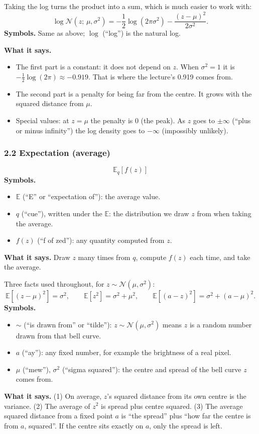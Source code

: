 Taking the log turns the product into a sum, which is much easier to work with:
\[
\log \mathcal{N}(z;\, \mu, \sigma^2) = -\frac{1}{2}\log(2\pi\sigma^2) - \frac{(z-\mu)^2}{2\sigma^2}.
\]
\textbf{Symbols.} Same as above; $\log$ (``log'') is the natural log.

\textbf{What it says.}
\begin{itemize}[leftmargin=1.5em]
\item The first part is a constant: it does not depend on $z$. When $\sigma^2 = 1$ it is $-\tfrac{1}{2}\log(2\pi) \approx -0.919$. That is where the lecture's 0.919 comes from.
\item The second part is a penalty for being far from the centre. It grows with the squared distance from $\mu$.
\item Special values: at $z = \mu$ the penalty is 0 (the peak). As $z$ goes to $\pm\infty$ (``plus or minus infinity'') the log density goes to $-\infty$ (impossibly unlikely).
\end{itemize}

\subsubsection*{2.2 Expectation (average)}

\[
\mathbb{E}_q[f(z)]
\]
\textbf{Symbols.}
\begin{itemize}[leftmargin=1.5em, itemsep=0pt]
\item $\mathbb{E}$ (``E'' or ``expectation of''): the average value.
\item $q$ (``cue''), written under the $\mathbb{E}$: the distribution we draw $z$ from when taking the average.
\item $f(z)$ (``f of zed''): any quantity computed from $z$.
\end{itemize}
\textbf{What it says.} Draw $z$ many times from $q$, compute $f(z)$ each time, and take the average.

Three facts used throughout, for $z \sim \mathcal{N}(\mu, \sigma^2)$:
\[
\mathbb{E}[(z-\mu)^2] = \sigma^2,
\qquad
\mathbb{E}[z^2] = \sigma^2 + \mu^2,
\qquad
\mathbb{E}[(a - z)^2] = \sigma^2 + (a-\mu)^2.
\]
\textbf{Symbols.}
\begin{itemize}[leftmargin=1.5em, itemsep=0pt]
\item $\sim$ (``is drawn from'' or ``tilde''): $z \sim \mathcal{N}(\mu, \sigma^2)$ means $z$ is a random number drawn from that bell curve.
\item $a$ (``ay''): any fixed number, for example the brightness of a real pixel.
\item $\mu$ (``mew''), $\sigma^2$ (``sigma squared''): the centre and spread of the bell curve $z$ comes from.
\end{itemize}
\textbf{What it says.} (1) On average, $z$'s squared distance from its own centre is the variance. (2) The average of $z^2$ is spread plus centre squared. (3) The average squared distance from a fixed point $a$ is ``the spread'' plus ``how far the centre is from $a$, squared''. If the centre sits exactly on $a$, only the spread is left.

